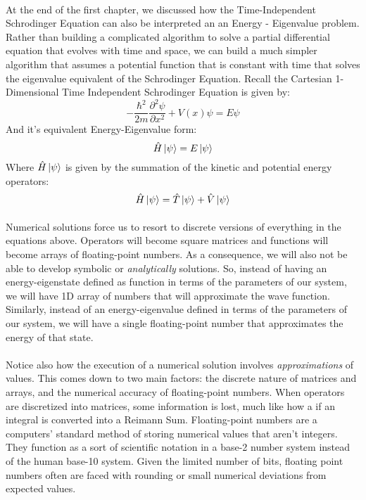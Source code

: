 \documentclass[12pt,letterpaper]{book}
\begin{document}
\paragraph*{}At the end of the first chapter, we discussed how the Time-Independent Schrodinger Equation can also be interpreted an an Energy - Eigenvalue problem. Rather than building a complicated algorithm to solve a partial differential equation that evolves with time and space, we can build a much simpler algorithm that assumes a potential function that is constant with time that solves the eigenvalue equivalent of the Schrodinger Equation. Recall the Cartesian 1-Dimensional Time Independent Schrodinger Equation is given by:
\begin{equation}
-\frac{\hbar^2}{2m}\frac{\partial^2 \psi}{\partial x^2} + V(x)\psi = E\psi
\end{equation}
And it's equivalent Energy-Eigenvalue form:
\begin{equation}
\hat{H}\ket{\psi} = E\ket{\psi}
\end{equation}
Where $\hat{H}\ket{\psi}$ is given by the summation of the kinetic and potential energy operators:
\begin{equation}
\hat{H}\ket{\psi} = \hat{T}\ket{\psi} + \hat{V}\ket{\psi}
\end{equation}

\paragraph*{}Numerical solutions force us to resort to discrete versions of everything in the equations above. Operators will become square matrices  and functions will become arrays of floating-point numbers. As a consequence, we will also not be able to develop symbolic or \textit{analytically} solutions. So, instead of having an energy-eigenstate defined as function in terms of the parameters of our system, we will have 1D array of numbers that will approximate the wave function. Similarly, instead of an energy-eigenvalue defined in terms of the parameters of our system, we will have a single floating-point number that approximates the energy of that state.

\paragraph*{}Notice also how the execution of a numerical solution involves \textit{approximations} of values. This comes down to two main factors: the discrete nature of matrices and arrays, and the numerical accuracy of floating-point numbers. When operators are discretized into matrices, some information is lost, much like how a if an integral is converted into a Reimann Sum. Floating-point numbers are a computers' standard method of storing numerical values that aren't integers. They function as a sort of scientific notation in a base-2 number system instead of the human base-10 system. Given the limited number of bits, floating point numbers often are faced with rounding or small numerical deviations from expected values.
\end{document}
